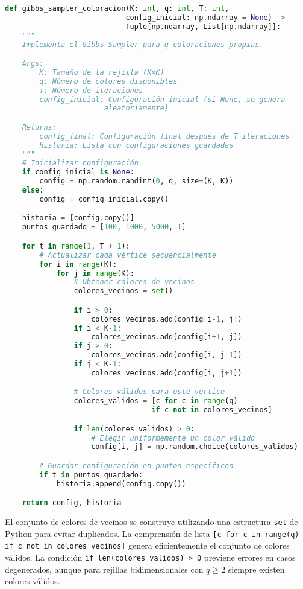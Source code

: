 \begin{lstlisting}[language=Python]
def gibbs_sampler_coloracion(K: int, q: int, T: int,
                            config_inicial: np.ndarray = None) ->
                            Tuple[np.ndarray, List[np.ndarray]]:
    """
    Implementa el Gibbs Sampler para q-coloraciones propias.

    Args:
        K: Tamaño de la rejilla (K×K)
        q: Número de colores disponibles
        T: Número de iteraciones
        config_inicial: Configuración inicial (si None, se genera
                       aleatoriamente)

    Returns:
        config_final: Configuración final después de T iteraciones
        historia: Lista con configuraciones guardadas
    """
    # Inicializar configuración
    if config_inicial is None:
        config = np.random.randint(0, q, size=(K, K))
    else:
        config = config_inicial.copy()

    historia = [config.copy()]
    puntos_guardado = [100, 1000, 5000, T]

    for t in range(1, T + 1):
        # Actualizar cada vértice secuencialmente
        for i in range(K):
            for j in range(K):
                # Obtener colores de vecinos
                colores_vecinos = set()

                if i > 0:
                    colores_vecinos.add(config[i-1, j])
                if i < K-1:
                    colores_vecinos.add(config[i+1, j])
                if j > 0:
                    colores_vecinos.add(config[i, j-1])
                if j < K-1:
                    colores_vecinos.add(config[i, j+1])

                # Colores válidos para este vértice
                colores_validos = [c for c in range(q)
                                  if c not in colores_vecinos]

                if len(colores_validos) > 0:
                    # Elegir uniformemente un color válido
                    config[i, j] = np.random.choice(colores_validos)

        # Guardar configuración en puntos específicos
        if t in puntos_guardado:
            historia.append(config.copy())

    return config, historia
\end{lstlisting}

El conjunto de colores de vecinos se construye utilizando una estructura \texttt{set} de Python para evitar duplicados. La comprensión de lista \texttt{[c for c in range(q) if c not in colores\_vecinos]} genera eficientemente el conjunto de colores válidos. La condición \texttt{if len(colores\_validos) > 0} previene errores en casos degenerados, aunque para rejillas bidimensionales con $q \geq 2$ siempre existen colores válidos.

